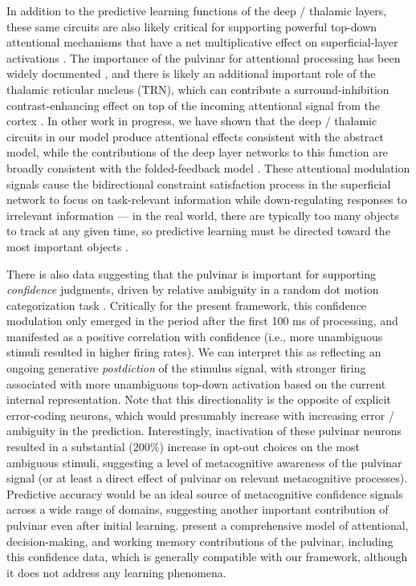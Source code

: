 \documentclass[11pt,twoside]{article}
\newif\myifpdf
\begin{document}
In addition to the predictive learning functions of the deep / thalamic layers, these same circuits are also likely critical for supporting powerful top-down attentional mechanisms that have a net multiplicative effect on superficial-layer activations \citep{BortoneOlsenScanziani14,OlsenBortoneAdesnikEtAl12,BortoneOlsenScanziani14,OlsenBortoneAdesnikEtAl12}. The importance of the pulvinar for attentional processing has been widely documented \cite[e.g.,]{LaBergeBuchsbaum90,BenderYouakim01,SaalmannPinskWangEtAl12}, and there is likely an additional important role of the thalamic reticular nucleus (TRN), which can contribute a surround-inhibition contrast-enhancing effect on top of the incoming attentional signal from the cortex \citep{Crick84,Pinault04,WimmerSchmittDavidsonEtAl15,JaramilloMejiasWang19}. In other work in progress, we have shown that the deep / thalamic circuits in our model produce attentional effects consistent with the abstract \citet{ReynoldsHeeger09} model, while the contributions of the deep layer networks to this function are broadly consistent with the folded-feedback model \citep{Grossberg99}.  These attentional modulation signals cause the bidirectional constraint satisfaction process in the superficial network to focus on task-relevant information while down-regulating responses to irrelevant information --- in the real world, there are typically too many objects to track at any given time, so predictive learning must be directed toward the most important objects \citep{Pylyshyn89,CavanaghHuntAfrazEtAl10,RichterdeLange19}.

There is also data suggesting that the pulvinar is important for supporting \emph{confidence} judgments, driven by relative ambiguity in a random dot motion categorization task \citep{KomuraNikkuniHirashimaEtAl13}.  Critically for the present framework, this confidence modulation only emerged in the period after the first 100 ms of processing, and manifested as a positive correlation with confidence (i.e., more unambiguous stimuli resulted in higher firing rates).  We can interpret this as reflecting an ongoing generative \emph{postdiction} of the stimulus signal, with stronger firing associated with more unambiguous top-down activation based on the current internal representation.  Note that this directionality is the opposite of explicit error-coding neurons, which would presumably increase with increasing error / ambiguity in the prediction.  Interestingly, inactivation of these pulvinar neurons resulted in a substantial (200\%) increase in opt-out choices on the most ambiguous stimuli, suggesting a level of metacognitive awareness of the pulvinar signal (or at least a direct effect of pulvinar on relevant metacognitive processes).  Predictive accuracy would be an ideal source of metacognitive confidence signals across a wide range of domains, suggesting another important contribution of pulvinar even after initial learning.  \citet{JaramilloMejiasWang19} present a comprehensive model of attentional, decision-making, and working memory contributions of the pulvinar, including this confidence data, which is generally compatible with our framework, although it does not address any learning phenomena.
\end{document}
